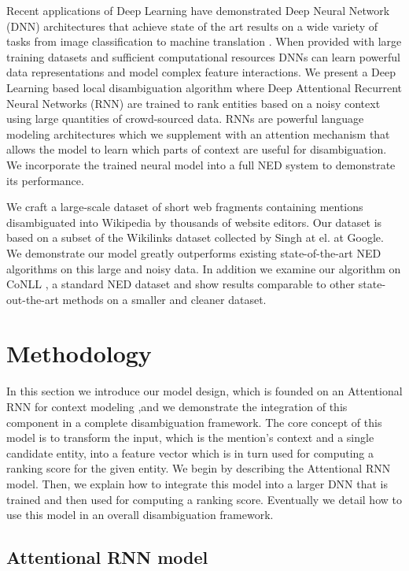 \documentclass[11pt]{article}
\begin{document}
Recent applications of Deep Learning have demonstrated Deep Neural Network (DNN) architectures that achieve state of the art results on a wide variety of tasks from image classification \cite{krizhevsky2012imagenet} to machine translation \cite{bahdanau2014neural}. When provided with large training datasets and sufficient computational resources DNNs can learn powerful data representations and model complex feature interactions. We present a Deep Learning based local disambiguation algorithm where Deep Attentional Recurrent Neural Networks (RNN) are trained to rank entities based on a noisy context using large quantities of crowd-sourced data. RNNs are powerful language modeling architectures which we supplement with an attention mechanism that allows the model to learn which parts of context are useful for disambiguation. We incorporate the trained neural model into a full NED system to demonstrate its performance.

We craft a large-scale dataset of short web fragments containing mentions disambiguated into Wikipedia by thousands of website editors. Our dataset is based on a subset of the Wikilinks dataset \cite{singh12:wiki-links} collected by Singh at el. at Google. We demonstrate our model greatly outperforms existing state-of-the-art NED algorithms on this large and noisy data. In addition we examine our algorithm on CoNLL \cite{hoffart2011robust}, a standard NED dataset and show results comparable to other state-out-the-art methods on a smaller and cleaner dataset.

\section{Methodology}

In this section we introduce our model design, which is founded on an Attentional RNN for context modeling ,and we demonstrate the integration of this component in a complete disambiguation framework. The core concept of this model is to transform the input, which is the mention's context and a single candidate entity, into a feature vector which is in turn used for computing a ranking score for the given entity. We begin by describing the Attentional RNN model. Then, we explain how to integrate this model into a larger DNN that is trained and then used for computing a ranking score. Eventually we detail how to use this model in an overall disambiguation framework.

\subsection{Attentional RNN model}
\end{document}

